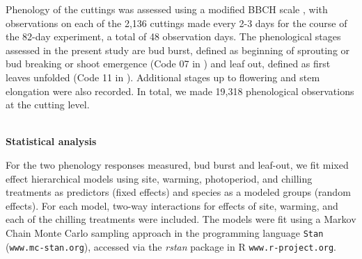 \documentclass[11pt]{article}
\begin{document}
Phenology of the cuttings was assessed using a modified BBCH scale \citet{Finn:2007}, with observations on each of the 2,136 cuttings made every 2-3 days for the course of the 82-day experiment, a total of 48 observation days. The phenological stages assessed in the present study are bud burst, defined as beginning of sprouting or bud breaking or shoot emergence (Code 07 in \citet{Finn:2007}) and leaf out, defined as first leaves unfolded (Code 11 in \citep{Finn:2007}). Additional stages up to flowering and stem elongation were also recorded. In total, we made 19,318 phenological observations at the cutting level.
%

\vspace{1ex}\\
\noindent \textbf{Statistical analysis}

For the two phenology responses measured, bud burst and leaf-out, we fit mixed effect hierarchical models using site, warming, photoperiod, and chilling treatments as predictors (fixed effects) and species as a modeled groups (random effects). For each model, two-way interactions for effects of site, warming, and each of the chilling treatments were included. The models were fit using a Markov Chain Monte Carlo sampling approach in the programming language \texttt{Stan} \citep{Carpenter:2016aa}(\texttt{www.mc-stan.org}), accessed via the \textit{rstan} package in R \texttt{www.r-project.org}.
\end{document}
